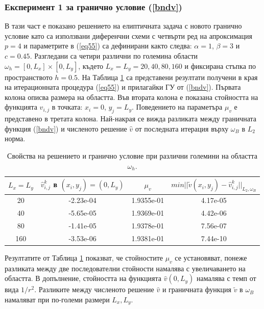 \documentclass{article}
\newcommand{\rf}[1]{(\ref{#1})}
\theoremstyle{remark}
\begin{document}
\subsubsection{Експеримент 1 за  гранично условие \rf{bndv}}
В тази част е показано решението на елиптичната задача с новото гранично условие като са използвани диференчни схеми с четвърти ред на апроксимация $p=4$ и параметрите в \rf{eq55} са дефинирани както следва: $\alpha = 1$, $\beta = 3$ и $c=0.45$. Разгледани са четири различни по големина области $\omega_h = [0, L_x] \times [0, L_y]$, където $L_x = L_y = 20, 40, 80, 160$ и фиксирана стъпка по пространството $h=0.5$. На Таблица \ref{tab:valBnd1} са представени резултати получени в края на итерационната процедура \rf{eq55} и прилагайки ГУ от \rf{bndv}. Първата колона описва размера на областта. Във втората колона е показана стойността на функцията $\widehat{v}_{i,j}$ в точката: ${x}_i = 0$, $ {y}_j =   L_{ y}$. Поведението на параметъра $\mu_v$ е представено в третата колона. Най-накрая се вижда разликата между граничната функция \rf{bndv} и численото решение $\widehat{v}$ от последната итерация върху $\omega_B$ в $L_2$ норма.
\begin{table}[ht]
\centering
		\begin{tabular}{||c||c|c|c||}
			\hline
			\hline
      $ L_{ x} = L_{ y}$        &         $\widehat{v}_{i,j}^k$ в  $({x}_i, {y}_j) = (0, L_{ y})$    &    $\mu_v$  &   \mbox{$min|| \tilde v( x_i, y_j) - \widehat v ^k_{i,j} ||_{L_2,\omega_B}$}\\
   			\hline
			\hline
      20    & -2.23e-04    &  1.9355e-01  &     4.17e-05  \\
               	 \hline
    40      & -5.65e-05   &   1.9369e-01    &    4.42e-06 \\
			\hline 	
      80    & -1.41e-05  &      1.9378e-01      &       7.56e-07  \\
			\hline 	
     160     & -3.53e-06  &    1.9381e-01        &     7.44e-10 \\
		   \hline
	             \hline
                     \end{tabular}
\caption{Свойства на решението и гранично условие при различни големини на областта $\omega_h$.}
\label{tab:valBnd1}
\end{table}
\FloatBarrier
Резултатите от Таблица \ref{tab:valBnd1} показват, че стойностите $\mu_v$ се установяват, понеже разликата между две последователни стойности намалява с увеличаването на областта. В допълнение, стойността на функцията $\widehat v(0,L_y)$ намалява с темп от вида $1/r^2$. Разликите между численото решение $\widehat v$ и граничната функция $\tilde v$ в $\omega_B$ намаляват при по-големи размери $L_x, L_y$. 
\end{document}
